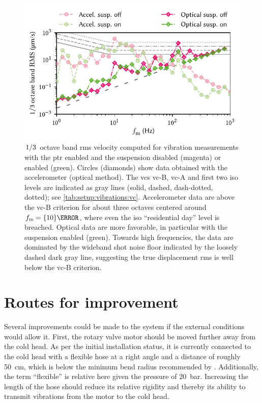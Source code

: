 \begin{figure}
    \centering
    \includegraphics{img/pdf/setup/vc}
    \caption[]{
        $\flatfrac{1}{3}$ octave band \gls{rms} velocity computed for vibration measurements with the \gls{ptr} enabled and the suspension disabled (magenta) or enabled (green).
        Circles (diamonds) show data obtained with the accelerometer (optical method).
        The \glspl{vc} \acrshort{vc}-B, \acrshort{vc}-A and first two \gls{iso} levels are indicated as gray lines (solid, dashed, dash-dotted, dotted); see \cref{tab:setup:vibrations:vc}.
        Accelerometer data are above the \acrshort{vc}-B criterion for about three octaves centered around $f_{\mr{m}}=\qty{10}{\hertz}$, where even the \gls{iso} \enquote{residential day} level is breached.
        Optical data are more favorable, in particular with the suspension enabled (green).
        Towards high frequencies, the data are dominated by the wideband shot noise floor indicated by the loosely dashed dark gray line, suggesting the true displacement \gls{rms} is well below the \acrshort{vc}-B criterion.
    }
    \label{fig:setup:vibrations:vc}
\end{figure}

\section{Routes for improvement}\label{sec:setup:vibrations:outlook}
Several improvements could be made to the system if the external conditions would allow it.
First, the rotary valve motor should be moved further away from the cold head.
As per the initial installation status, it is currently connected to the cold head with a flexible hose at a right angle and a distance of roughly \qty{50}{\cm}, which is below the minimum bend radius recommended by \oxinst.
Additionally, the term \enquote{flexible} is relative here given the pressure of \qty{20}{\bar}.
Increasing the length of the hose should reduce its relative rigidity and thereby its ability to transmit vibrations from the motor to the cold head.

